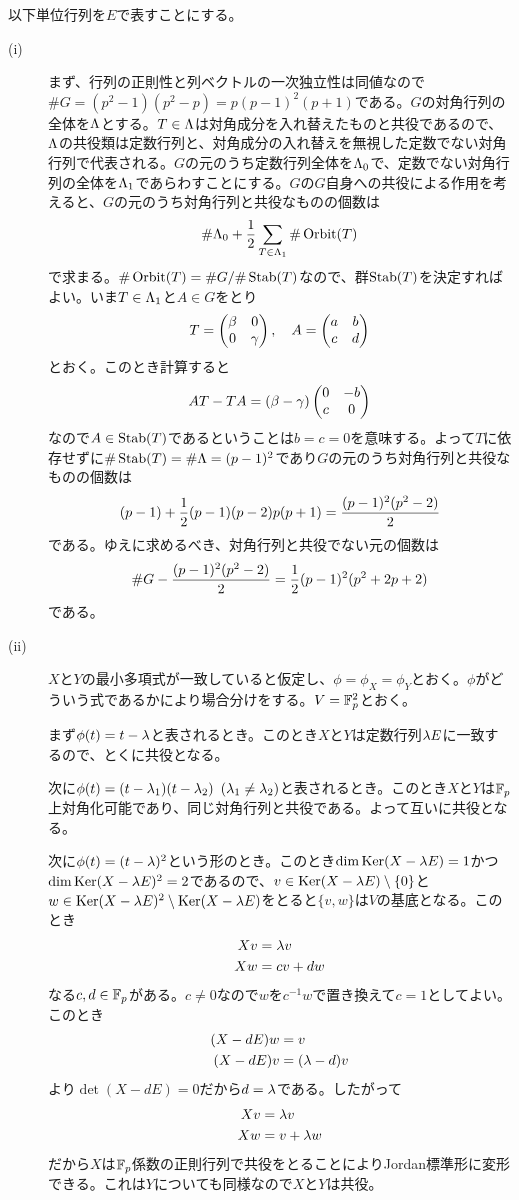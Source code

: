 \begin{sol} 以下単位行列を$E$で表すことにする。
  \begin{description}
    \item[(i)] まず、行列の正則性と列ベクトルの一次独立性は同値なので$\# G= (p^2-1)(p^2 - p) = p(p-1)^2(p+1)$である。$G$の対角行列の全体を${\Lambda}$とする。$T \in {\Lambda}$は対角成分を入れ替えたものと共役であるので、${\Lambda}$の共役類は定数行列と、対角成分の入れ替えを無視した定数でない対角行列で代表される。$G$の元のうち定数行列全体を${\Lambda}_0$で、定数でない対角行列の全体を${\Lambda}_1$であらわすことにする。$G$の$G$自身への共役による作用を考えると、$G$の元のうち対角行列と共役なものの個数は
    \[
    \# {\Lambda}_0 + \frac{1}{2} \sum_{T \in {\Lambda}_1} \# \operatorname{Orbit} (T)
    \]
    で求まる。$\# \operatorname{Orbit} (T) = \# G / \# \operatorname{Stab} (T)$なので、群$\operatorname{Stab} (T)$を決定すればよい。いま$T \in {\Lambda}_1$と$A \in G$をとり
    \[
    T = \begin{pmatrix}  \beta & 0 \\ 0 & {\gamma} \end{pmatrix}, \quad A = \begin{pmatrix} a & b\\ c & d \end{pmatrix}
    \]
    とおく。このとき計算すると
    \[
 AT - TA = (\beta - {\gamma}) \begin{pmatrix} 0 & -b \\ c & 0 \end{pmatrix}
    \]
    なので$A \in \operatorname{Stab} (T)$であるということは$b=c=0$を意味する。よって$T$に依存せずに$\# \operatorname{Stab}(T) =\# {\Lambda}= (p-1)^2$であり$G$の元のうち対角行列と共役なものの個数は
    \[
    (p-1) + \frac{1}{2} (p-1)(p-2) p(p+1) = \frac{(p-1)^2 (p^2 -2)}{2}
    \]
    である。ゆえに求めるべき、対角行列と共役でない元の個数は
    \[
    \# G - \frac{(p-1)^2 (p^2 -2)}{2} = \frac{1}{2} (p-1)^2 (p^2 + 2p +2)
    \]
    である。
    \item[(ii)] $X$と$Y$の最小多項式が一致していると仮定し、$\phi = \phi_X = \phi_Y$とおく。$\phi$がどういう式であるかにより場合分けをする。$V = {\mathbb F}_p^2$とおく。

    まず$\phi(t) = t - {\lambda}$と表されるとき。このとき$X$と$Y$は定数行列${\lambda} E$に一致するので、とくに共役となる。

    次に$\phi(t) = (t- {\lambda}_1)(t-{\lambda}_2)$ $({\lambda}_1 \neq {\lambda}_2)$と表されるとき。このとき$X$と$Y$は${\mathbb F}_p$上対角化可能であり、同じ対角行列と共役である。よって互いに共役となる。

    次に$\phi(t) = (t - {\lambda})^2$という形のとき。このとき$\dim \operatorname{Ker} (X - {\lambda} E) = 1$かつ$\dim \operatorname{Ker} (X - {\lambda} E)^2 = 2$であるので、$v \in \operatorname{Ker} (X - {\lambda} E) \setminus \{0\}$と$w \in \operatorname{Ker} (X - {\lambda} E)^2 \setminus \operatorname{Ker} (X - {\lambda} E)$をとると$\{v , w \}$は$V$の基底となる。このとき
    \begin{align*}
      Xv &= {\lambda} v \\
      Xw &= cv + dw
    \end{align*}
    なる$c,d \in {\mathbb F}_p$がある。$c \neq 0$なので$w$を$c^{-1}w$で置き換えて$c=1$としてよい。このとき
    \begin{align*}
      (X-dE)w &=  v \\
      (X-dE)v &= ({\lambda} -d )v
    \end{align*}
    より$\det (X-dE)=0$だから$d={\lambda}$である。したがって
    \begin{align*}
      Xv &= {\lambda} v \\
      Xw &= v + {\lambda} w
    \end{align*}
    だから$X$は${\mathbb F}_p$係数の正則行列で共役をとることによりJordan標準形に変形できる。これは$Y$についても同様なので$X$と$Y$は共役。


\end{description}
\end{sol}
